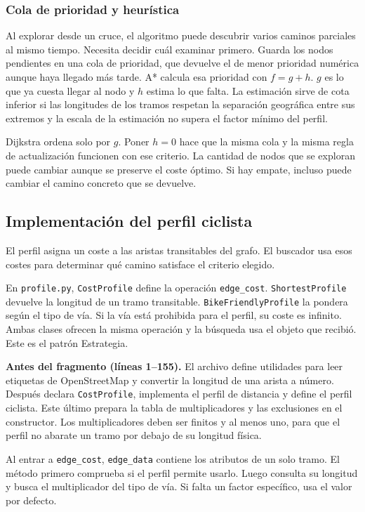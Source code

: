 \documentclass[11pt,a4paper]{article}
\begin{document}
\subsubsection{Cola de prioridad y heurística}
Al explorar desde un cruce, el algoritmo puede descubrir varios caminos parciales al mismo tiempo. Necesita decidir cuál examinar primero. Guarda los nodos pendientes en una cola de prioridad, que devuelve el de menor prioridad numérica aunque haya llegado más tarde. A* calcula esa prioridad con \(f=g+h\). \(g\) es lo que ya cuesta llegar al nodo y \(h\) estima lo que falta. La estimación sirve de cota inferior si las longitudes de los tramos respetan la separación geográfica entre sus extremos y la escala de la estimación no supera el factor mínimo del perfil.

Dijkstra ordena solo por \(g\). Poner \(h=0\) hace que la misma cola y la misma regla de actualización funcionen con ese criterio. La cantidad de nodos que se exploran puede cambiar aunque se preserve el coste óptimo. Si hay empate, incluso puede cambiar el camino concreto que se devuelve.

\clearpage

\subsection{Implementación del perfil ciclista}

El perfil asigna un coste a las aristas transitables del grafo. El buscador usa esos costes para determinar qué camino satisface el criterio elegido.

En \texttt{profile.py}, \texttt{CostProfile} define la operación \texttt{edge\_cost}. \texttt{ShortestProfile} devuelve la longitud de un tramo transitable. \texttt{BikeFriendlyProfile} la pondera según el tipo de vía. Si la vía está prohibida para el perfil, su coste es infinito. Ambas clases ofrecen la misma operación y la búsqueda usa el objeto que recibió. Este es el patrón Estrategia.

\textbf{Antes del fragmento (líneas 1--155).} El archivo define utilidades para leer etiquetas de OpenStreetMap y convertir la longitud de una arista a número. Después declara \texttt{CostProfile}, implementa el perfil de distancia y define el perfil ciclista. Este último prepara la tabla de multiplicadores y las exclusiones en el constructor. Los multiplicadores deben ser finitos y al menos uno, para que el perfil no abarate un tramo por debajo de su longitud física.

Al entrar a \texttt{edge\_cost}, \texttt{edge\_data} contiene los atributos de un solo tramo. El método primero comprueba si el perfil permite usarlo. Luego consulta su longitud y busca el multiplicador del tipo de vía. Si falta un factor específico, usa el valor por defecto.
\end{document}
